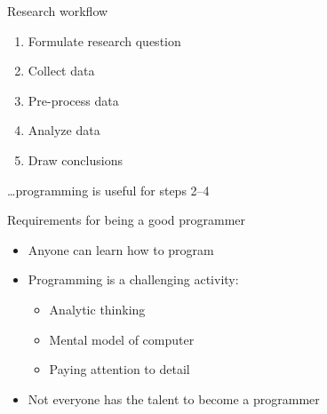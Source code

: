 \documentclass[aspectratio=169,usenames,dvipsnames]{beamer}
\begin{document}
\begin{frame}{Research workflow}
    \begin{enumerate}
        \item Formulate research question
        \item Collect data
        \item Pre-process data
        \item Analyze data
        \item Draw conclusions
    \end{enumerate}

    \pause
    \dots programming is useful for steps 2--4
\end{frame}

\begin{frame}{Requirements for being a good programmer}
    \begin{itemize}
        \item Anyone can learn how to program
        \item Programming is a challenging activity:
            \begin{itemize}
                \item Analytic thinking
                \item Mental model of computer
                \item Paying attention to detail
            \end{itemize}
        \item Not everyone has the talent to become
            a  programmer
    \end{itemize}
\end{frame}
\end{document}
